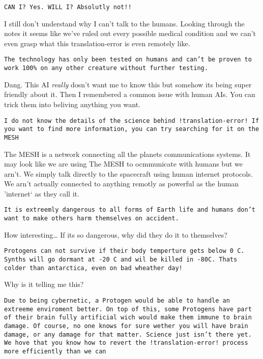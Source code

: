 \documentclass{article}
\begin{document}

\texttt{CAN I? Yes. WILL I? Absolutly not!!}


I still don't understand why I can't talk to the humans. Looking
through the notes it seems like we've ruled out every possible medical condition
and we can't even grasp what this translation-error is even remotely like.


\texttt{The technology has only been tested on humans and can't be proven
to work 100\% on any other creature without further testing.}

Dang. This AI \emph{really} dosn't want me to know this but somehow its
being super friendly about it. Then I remembered a common issue with human AIs.
You can trick them into beliving anything you want.


\texttt{I do not know the details of the science behind !translation-error!
If you want to find more information, you can try searching for it on the MESH}

The MESH is a network connecting all the planets communications systems. It may look
like we are using The MESH to ocmmunicate with humans but we arn't. We simply
talk directly to the spacecraft using human internet protocols. We arn't actually
connected to anything remotly as powerful as the human 'internet` as they call it.


\texttt{It is extreemly dangerous to all forms of Earth life and humans don't
want to make others harm themselves on accident.}

How interesting\ldots{} If its so dangerous, why did they do it to themselves?


\texttt{Protogens can not survive if their body temperture gets below 0 C.
Synths will go dormant at -20 C and wil be killed in -80C. Thats colder
than antarctica, even on bad wheather day!}

Why is it telling me this?


\texttt{Due to being cybernetic, a Protogen would be able to handle an extreeme enviroment
better. On top of this, some Protogens have part of their brain fully artificial
wich would make them immune to brain damage. Of course, no one knows for sure
wether you will have brain damage, or any damage for that matter. Science just
isn't there yet. We hove that you know how to revert the !translation-error! process
more efficiently than we can}
\end{document}
